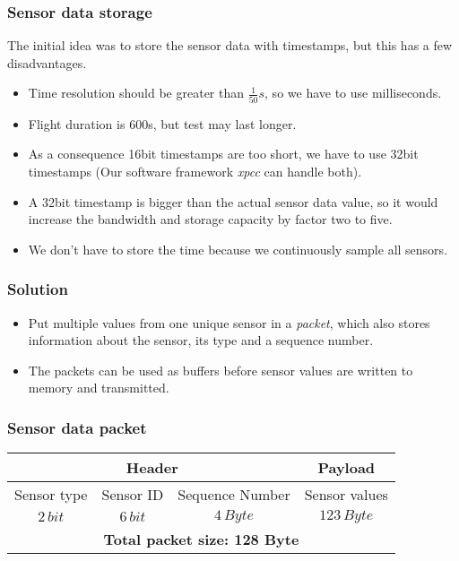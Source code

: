 \documentclass[12pt, a4paper]{scrreprt}
\begin{document}
\subsubsection{Sensor data storage}
The initial idea was to store the sensor data with timestamps, but this has a few disadvantages.
\begin{itemize}
	\item Time resolution should be greater than $\frac{1}{50}s$, so we have to use milliseconds.
	\item Flight duration is 600s, but test may last longer.
	\item As a consequence 16bit timestamps are too short, we have to use 32bit timestamps (Our software framework \textit{xpcc} can handle both).
	\item A 32bit timestamp is bigger than the actual sensor data value, so it would increase the bandwidth and storage capacity by factor two to five.
	\item We don't have to store the time because we continuously sample all sensors.
\end{itemize}

\subsubsection{Solution}
\begin{itemize}
	\item Put multiple values from one unique sensor in a \textit{packet}, which also stores information about the sensor, its type and a sequence number.
	\item The packets can be used as buffers before sensor values are written to memory and transmitted.
\end{itemize}

\subsubsection{Sensor data packet}
\begin{tabular}{|c|c|c|c|}
	\hline 
	\multicolumn{3}{|c|}{\textbf{Header}} & \textbf{Payload} \\ 
	\hline 
	Sensor type & Sensor ID & Sequence Number  & Sensor values \\ 
	\hline 
	$2\,bit$ & $6\,bit$ & $4\,Byte$ & $123\,Byte$ \\ 
	\hline 
	\multicolumn{4}{|c|}{\textbf{Total packet size: 128 Byte}} \\ 
	\hline 
\end{tabular} 
\end{document}
